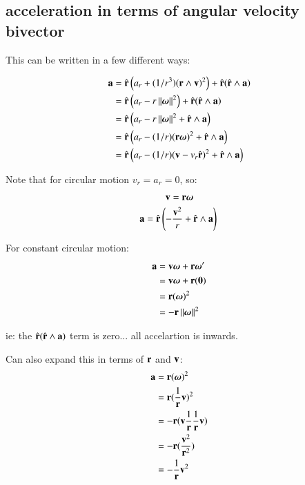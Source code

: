 \documentclass{article}      %
\newcommand{\Norm}[1]{\left\lVert{#1}\right\rVert}
\begin{document}
\subsection{acceleration in terms of angular velocity bivector}

This can be written in a few different ways:

\begin{align*}
\Ba 
   &= \rcap \left(  a_r +(1/{r^3})(\Br \wedge \Bv)^2\right) +    \rcap(\rcap \wedge \Ba) \\
   &= \rcap \left(  a_r -r \Norm{\Bomega}^2\right) + \rcap(\rcap \wedge \Ba) \\
   &= \rcap \left(  a_r -r \Norm{\Bomega}^2 + \rcap \wedge \Ba \right) \\
   &= \rcap \left(  a_r -(1/r)(\Br\Bomega)^2 + \rcap \wedge \Ba \right) \\
   &= \rcap \left(  a_r -(1/r)(\Bv - v_r\rcap)^2 + \rcap \wedge \Ba \right) \\
\end{align*}

Note that for circular motion $v_r = a_r = 0$, so:

\[
\mathbf{v} = \mathbf{r} \boldsymbol{\omega}
\]
\[
\mathbf{a} = \hat{\mathbf{r}} \left(  -\frac{\mathbf{v}^2}{r} + \hat{\mathbf{r}} \wedge \mathbf{a} \right) \\
\]

For constant circular motion:
\begin{align*}
\Ba 
   &= \Bv\Bomega + \Br\Bomega' \\
   &= \Bv\Bomega + \Br(\Bzero) \\
   &= \Br(\Bomega)^2 \\
   &= -\Br\Norm{\Bomega}^2 \\
\end{align*}

ie: the $\hat{\mathbf{r}} (\hat{\mathbf{r}} \wedge \mathbf{a} )$ term is zero... all accelartion is inwards.

Can also expand this in terms of $\mathbf{r}$ and $\mathbf{v}$:
\begin{align*}
\mathbf{a} 
   &= \mathbf{r}(\boldsymbol{\omega})^2 \\
   &= \mathbf{r}(\frac{1}{\mathbf{r}}\mathbf{v})^2 \\
   &= -\mathbf{r}( \mathbf{v} \frac{1}{\mathbf{r}} \frac{1}{\mathbf{r}}\mathbf{v} ) \\
   &= -\mathbf{r}( \frac{\mathbf{v}^2}{\mathbf{r}^2}) \\
   &= -\frac{1}{\mathbf{r}}\mathbf{v}^2 \\
\end{align*}
\end{document}
